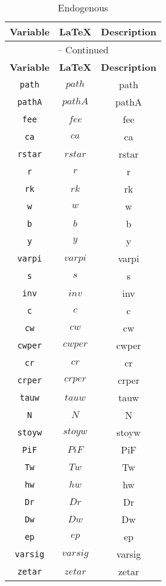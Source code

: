 \begin{center}
\begin{longtable}{ccc}
\caption{Endogenous}\\%
\hline%
\multicolumn{1}{c}{\textbf{Variable}} &
\multicolumn{1}{c}{\textbf{\LaTeX}} &
\multicolumn{1}{c}{\textbf{Description}}\\%
\hline\hline%
\endfirsthead
\multicolumn{3}{c}{{\tablename} \thetable{} -- Continued}\\%
\hline%
\multicolumn{1}{c}{\textbf{Variable}} &
\multicolumn{1}{c}{\textbf{\LaTeX}} &
\multicolumn{1}{c}{\textbf{Description}}\\%
\hline\hline%
\endhead
\texttt{path} & $path$ & path\\
\texttt{pathA} & $pathA$ & pathA\\
\texttt{fee} & $fee$ & fee\\
\texttt{ca} & $ca$ & ca\\
\texttt{rstar} & $rstar$ & rstar\\
\texttt{r} & $r$ & r\\
\texttt{rk} & $rk$ & rk\\
\texttt{w} & $w$ & w\\
\texttt{b} & $b$ & b\\
\texttt{y} & $y$ & y\\
\texttt{varpi} & $varpi$ & varpi\\
\texttt{s} & $s$ & s\\
\texttt{inv} & $inv$ & inv\\
\texttt{c} & $c$ & c\\
\texttt{cw} & $cw$ & cw\\
\texttt{cwper} & $cwper$ & cwper\\
\texttt{cr} & $cr$ & cr\\
\texttt{crper} & $crper$ & crper\\
\texttt{tauw} & $tauw$ & tauw\\
\texttt{N} & $N$ & N\\
\texttt{stoyw} & $stoyw$ & stoyw\\
\texttt{PiF} & $PiF$ & PiF\\
\texttt{Tw} & $Tw$ & Tw\\
\texttt{hw} & $hw$ & hw\\
\texttt{Dr} & $Dr$ & Dr\\
\texttt{Dw} & $Dw$ & Dw\\
\texttt{ep} & $ep$ & ep\\
\texttt{varsig} & $varsig$ & varsig\\
\texttt{zetar} & $zetar$ & zetar\\

\end{longtable}
\end{center}
